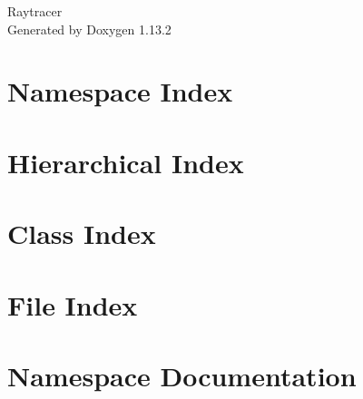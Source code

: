 \documentclass[twoside]{book}
\newcommand{\+}{\discretionary{\mbox{\scriptsize$\hookleftarrow$}}{}{}}
\newcommand{\clearemptydoublepage}{%
    \newpage{\pagestyle{empty}\cleardoublepage}%
  }
\begin{document}
  \raggedbottom
    \hypersetup{pageanchor=false,
                bookmarksnumbered=true,
                pdfencoding=unicode
               }
  \begin{titlepage}
  \vspace*{7cm}
  \begin{center}%
  {\Large Raytracer}\\
  \vspace*{1cm}
  {\large Generated by Doxygen 1.13.2}\\
  \end{center}
  \end{titlepage}
  \clearemptydoublepage
  \tableofcontents
  \clearemptydoublepage
  \hypersetup{pageanchor=true}

\chapter{Namespace Index}

\chapter{Hierarchical Index}

\chapter{Class Index}

\chapter{File Index}

\chapter{Namespace Documentation}

\end{document}

